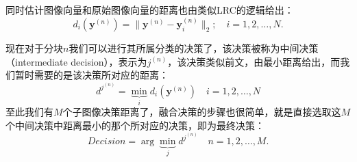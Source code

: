 \documentclass[UTF8]{ctexart}
\begin{document}
\par
同时估计图像向量和原始图像向量的距离也由类似LRC的逻辑给出：
\begin{equation}
    d_i(\mathbf{y}^{(n)})=\|\mathbf{y}^{(n)}-\mathbf{y}^{(n)}_i\|_2;\quad i=1,2,\dots,N.
\end{equation}
\par
现在对于分块\(n\)我们可以进行其所属分类的决策了，该决策被称为中间决策（intermediate decision），表示为\(j^{(n)}\)，该决策类似前文，由最小距离给出，而我们暂时需要的是该决策所对应的距离：
\begin{equation}
    d^{j^{(n)}}=\underbrace{\min}_i d_i(\mathbf{y}^{(n)})\quad i=1,2,\dots,N
\end{equation}
至此我们有\(M\)个子图像决策距离了，融合决策的步骤也很简单，就是直接选取这\(M\)个中间决策中距离最小的那个所对应的决策，即为最终决策：
\begin{equation}
    Decision=\arg{\underbrace{\min}_j}d^{j^{(n)}}\quad n=1,2,\dots,M.
\end{equation}
\end{document}
